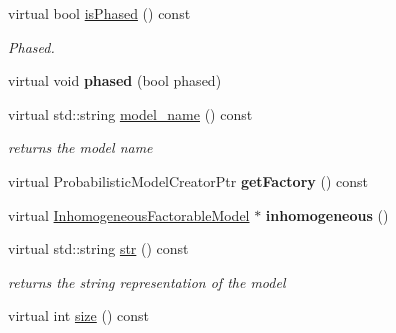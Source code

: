 \begin{DoxyCompactItemize}
virtual bool \hyperlink{classtops_1_1InhomogeneousMarkovChain_a442e4b53a0e21d7ea95668b7366e803f}{is\+Phased} () const
\begin{DoxyCompactList}\small\item\em Phased. \end{DoxyCompactList}\item 
\mbox{\label{classtops_1_1InhomogeneousMarkovChain_aa0b6965db95c168d64617b60d74a4fd6}} 
virtual void {\bfseries phased} (bool phased)
\item 
\mbox{\label{classtops_1_1InhomogeneousMarkovChain_ad272109a2c65cbe473939100a93a9552}} 
virtual std\+::string \hyperlink{classtops_1_1InhomogeneousMarkovChain_ad272109a2c65cbe473939100a93a9552}{model\+\_\+name} () const
\begin{DoxyCompactList}\small\item\em returns the model name \end{DoxyCompactList}\item 
\mbox{\label{classtops_1_1InhomogeneousMarkovChain_a77618f8825fead509c2bb7556fe8a78a}} 
virtual Probabilistic\+Model\+Creator\+Ptr {\bfseries get\+Factory} () const
\item 
\mbox{\label{classtops_1_1InhomogeneousMarkovChain_a8c66a9faa82527054d79b91e6ff11a32}} 
virtual \hyperlink{classtops_1_1InhomogeneousFactorableModel}{Inhomogeneous\+Factorable\+Model} $\ast$ {\bfseries inhomogeneous} ()
\item 
\mbox{\label{classtops_1_1InhomogeneousMarkovChain_a5d371f2201f8711d09ac6e275a3678bd}} 
virtual std\+::string \hyperlink{classtops_1_1InhomogeneousMarkovChain_a5d371f2201f8711d09ac6e275a3678bd}{str} () const
\begin{DoxyCompactList}\small\item\em returns the string representation of the model \end{DoxyCompactList}\item 
\mbox{\label{classtops_1_1InhomogeneousMarkovChain_a6d5c4847aae3bbea0a36732d64a40fbe}} 
virtual int \hyperlink{classtops_1_1InhomogeneousMarkovChain_a6d5c4847aae3bbea0a36732d64a40fbe}{size} () const

\end{DoxyCompactItemize}
